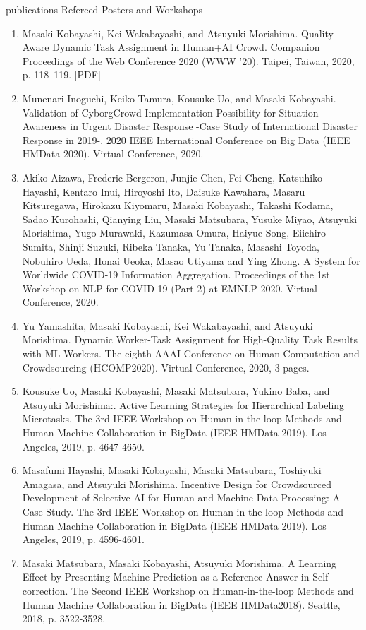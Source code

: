 \documentclass{resume} %
\begin{document}
\begin{rSection}{publications}
Refereed Posters and Workshops
\begin{enumerate}
  \setcounter{enumi}{0}
  \item Masaki Kobayashi, Kei Wakabayashi, and Atsuyuki Morishima. Quality-Aware Dynamic Task Assignment in Human+AI Crowd. Companion Proceedings of the Web Conference 2020 (WWW '20). Taipei, Taiwan, 2020, p. 118–119. [PDF]
  \item Munenari Inoguchi, Keiko Tamura, Kousuke Uo, and Masaki Kobayashi. Validation of CyborgCrowd Implementation Possibility for Situation Awareness in Urgent Disaster Response -Case Study of International Disaster Response in 2019-. 2020 IEEE International Conference on Big Data (IEEE HMData 2020). Virtual Conference, 2020.
  \item Akiko Aizawa, Frederic Bergeron, Junjie Chen, Fei Cheng, Katsuhiko Hayashi, Kentaro Inui, Hiroyoshi Ito, Daisuke Kawahara, Masaru Kitsuregawa, Hirokazu Kiyomaru, Masaki Kobayashi, Takashi Kodama, Sadao Kurohashi, Qianying Liu, Masaki Matsubara, Yusuke Miyao, Atsuyuki Morishima, Yugo Murawaki, Kazumasa Omura, Haiyue Song, Eiichiro Sumita, Shinji Suzuki, Ribeka Tanaka, Yu Tanaka, Masashi Toyoda, Nobuhiro Ueda, Honai Ueoka, Masao Utiyama and Ying Zhong. A System for Worldwide COVID-19 Information Aggregation. Proceedings of the 1st Workshop on NLP for COVID-19 (Part 2) at EMNLP 2020. Virtual Conference, 2020.
  \item Yu Yamashita, Masaki Kobayashi, Kei Wakabayashi, and Atsuyuki Morishima. Dynamic Worker-Task Assignment for High-Quality Task Results with ML Workers. The eighth AAAI Conference on Human Computation and Crowdsourcing (HCOMP2020). Virtual Conference, 2020, 3 pages.
  \item Kousuke Uo, Masaki Kobayashi, Masaki Matsubara, Yukino Baba, and Atsuyuki Morishima:. Active Learning Strategies for Hierarchical Labeling Microtasks. The 3rd IEEE Workshop on Human-in-the-loop Methods and Human Machine Collaboration in BigData (IEEE HMData 2019). Los Angeles, 2019, p. 4647-4650.
  \item Masafumi Hayashi, Masaki Kobayashi, Masaki Matsubara, Toshiyuki Amagasa, and Atsuyuki Morishima. Incentive Design for Crowdsourced Development of Selective AI for Human and Machine Data Processing: A Case Study. The 3rd IEEE Workshop on Human-in-the-loop Methods and Human Machine Collaboration in BigData (IEEE HMData 2019). Los Angeles, 2019, p. 4596-4601.
  \item Masaki Matsubara, Masaki Kobayashi, Atsuyuki Morishima. A Learning Effect by Presenting Machine Prediction as a Reference Answer in Self-correction. The Second IEEE Workshop on Human-in-the-loop Methods and Human Machine Collaboration in BigData (IEEE HMData2018). Seattle, 2018, p. 3522-3528.
\end{enumerate}







\end{rSection}
\end{document}

